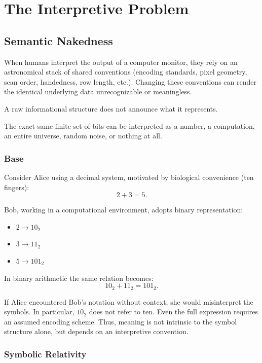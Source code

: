 \chapter{The Interpretive Problem}
\label{chap:interpretation-problem}

\section{Semantic Nakedness}

When humans interpret the output of a computer monitor, they rely on an astronomical stack of shared conventions (encoding standards,
pixel geometry, scan order, handedness, row length, etc.). Changing these conventions can render the identical underlying data unrecognizable or meaningless.

A raw informational structure does not announce what it represents. 

The exact same finite set of bits can be interpreted as a number, a computation, an entire universe, random noise, or nothing at all.


\subsection*{Base}

Consider Alice using a decimal system, motivated by biological convenience (ten fingers):
\[
2 + 3 = 5.
\]

Bob, working in a computational environment, adopts binary representation:
\begin{itemize}
\item $2 \rightarrow 10_2$
\item $3 \rightarrow 11_2$
\item $5 \rightarrow 101_2$
\end{itemize}

In binary arithmetic the same relation becomes:
\[
10_2 + 11_2 = 101_2.
\]

If Alice encountered Bob's notation without context, she would misinterpret the symbols.
In particular, $10_2$ does not refer to ten.
Even the full expression requires an assumed encoding scheme.
Thus, meaning is not intrinsic to the symbol structure alone, but depends on an interpretive convention.

\subsection*{Symbolic Relativity}

